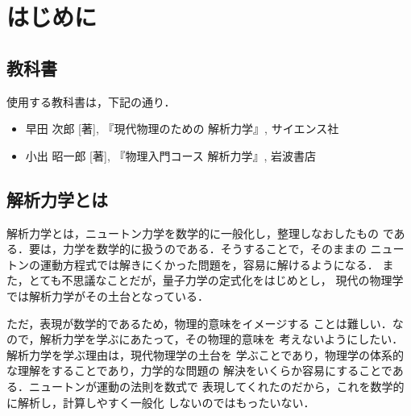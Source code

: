     \section{はじめに}
        \subsection{教科書}
            使用する教科書は，下記の通り．
            \begin{itemize}
                \item
                    早田 次郎 [著],
                    『現代物理のための 解析力学』,
                     サイエンス社
                 \item
                    小出 昭一郎 [著],
                    『物理入門コース 解析力学』,
                    岩波書店
            \end{itemize}

        \subsection{解析力学とは}
            解析力学とは，ニュートン力学を数学的に一般化し，整理しなおしたもの
            である．要は，力学を数学的に扱うのである．そうすることで，そのままの
            ニュートンの運動方程式では解きにくかった問題を，容易に解けるようになる．
            また，とても不思議なことだが，量子力学の定式化をはじめとし，
            現代の物理学では解析力学がその土台となっている．

            ただ，表現が数学的であるため，物理的意味をイメージする
            ことは難しい．なので，解析力学を学ぶにあたって，その物理的意味を
            考えないようにしたい．解析力学を学ぶ理由は，現代物理学の土台を
            学ぶことであり，物理学の体系的な理解をすることであり，力学的な問題の
            解決をいくらか容易にすることである．ニュートンが運動の法則を数式で
            表現してくれたのだから，これを数学的に解析し，計算しやすく一般化
            しないのではもったいない．

